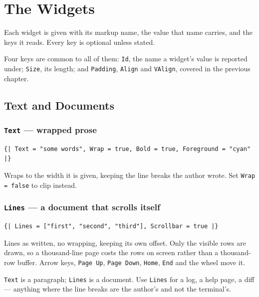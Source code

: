 \documentclass[11pt,a4paper,twoside,openany]{book}
\newcommand{\code}[1]{\texttt{\small #1}}
\begin{document}
\chapter{The Widgets}

Each widget is given with its markup name, the value that name carries, and the
keys it reads. Every key is optional unless stated.

Four keys are common to all of them: \code{Id}, the name a widget's value is reported
under; \code{Size}, its length; and \code{Padding}, \code{Align} and \code{VAlign},
covered in the previous chapter.

\section{Text and Documents}

\subsection{\texttt{Text} --- wrapped prose}

\begin{lstlisting}
{| Text = "some words", Wrap = true, Bold = true, Foreground = "cyan" |}
\end{lstlisting}

Wraps to the width it is given, keeping the line breaks the author wrote. Set
\code{Wrap = false} to clip instead.

\subsection{\texttt{Lines} --- a document that scrolls itself}

\begin{lstlisting}
{| Lines = ["first", "second", "third"], Scrollbar = true |}
\end{lstlisting}

Lines as written, no wrapping, keeping its own offset. Only the visible rows are
drawn, so a thousand-line page costs the rows on screen rather than a
thousand-row buffer. Arrow keys, \code{Page Up}, \code{Page Down}, \code{Home},
\code{End} and the wheel move it.

\begin{tipbox}
\code{Text} is a paragraph; \code{Lines} is a document. Use \code{Lines} for a
log, a help page, a diff --- anything where the line breaks are the author's and
not the terminal's.
\end{tipbox}
\end{document}
